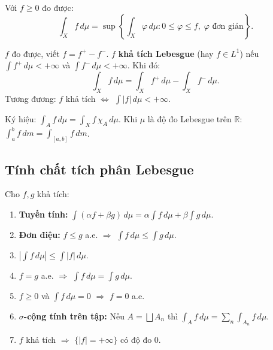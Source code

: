 \documentclass[12pt,a4paper]{article}
\begin{document}
\begin{dinhnghia}[title={Tích phân hàm không âm}]
  Với $f \ge 0$ đo được:
  \[
    \int_X f\,d\mu = \sup\left\{\int_X \varphi\,d\mu : 0 \le \varphi \le f,\; \varphi \text{ đơn giản}\right\}.
  \]
\end{dinhnghia}

\begin{dinhnghia}[title={Tích phân hàm tổng quát}]
  $f$ đo được, viết $f = f^+ - f^-$. $f$ \textbf{khả tích Lebesgue} (hay $f \in L^1$) nếu $\displaystyle\int f^+\,d\mu < +\infty$ và $\displaystyle\int f^-\,d\mu < +\infty$. Khi đó:
  \[
    \int_X f\,d\mu = \int_X f^+\,d\mu - \int_X f^-\,d\mu.
  \]
  Tương đương: $f$ khả tích $\Leftrightarrow$ $\displaystyle\int |f|\,d\mu < +\infty$.
\end{dinhnghia}

\begin{luuy}
  Ký hiệu: $\displaystyle\int_A f\,d\mu = \int_X f\,\chi_A\,d\mu$. Khi $\mu$ là độ đo Lebesgue trên $\mathbb{R}$: $\displaystyle\int_a^b f\,dm = \int_{[a,b]} f\,dm$.
\end{luuy}

\subsection{Tính chất tích phân Lebesgue}

\begin{tinhchat}
  Cho $f, g$ khả tích:
  \begin{enumerate}
    \item \textbf{Tuyến tính:} $\displaystyle\int (\alpha f + \beta g)\,d\mu = \alpha\int f\,d\mu + \beta\int g\,d\mu$.
    \item \textbf{Đơn điệu:} $f \le g$ a.e. $\Rightarrow$ $\displaystyle\int f\,d\mu \le \int g\,d\mu$.
    \item $\left|\displaystyle\int f\,d\mu\right| \le \int |f|\,d\mu$.
    \item $f = g$ a.e. $\Rightarrow$ $\displaystyle\int f\,d\mu = \int g\,d\mu$.
    \item $f \ge 0$ và $\displaystyle\int f\,d\mu = 0$ $\Rightarrow$ $f = 0$ a.e.
    \item \textbf{$\sigma$-cộng tính trên tập:} Nếu $A = \bigsqcup A_n$ thì $\displaystyle\int_A f\,d\mu = \sum_n \int_{A_n} f\,d\mu$.
    \item $f$ khả tích $\Rightarrow$ $\{|f| = +\infty\}$ có độ đo $0$.
  \end{enumerate}
\end{tinhchat}
\end{document}
